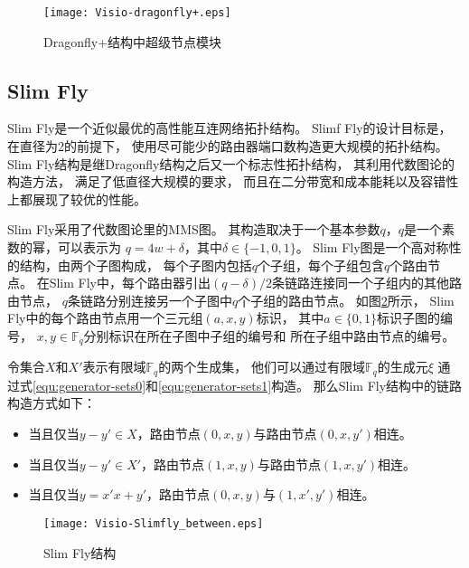 \begin{figure}[htp]
  \centering
    \texttt{[image: Visio-dragonfly+.eps]}
    \caption{Dragonfly+结构中超级节点模块}
    \label{dragonfly+}
\end{figure}

\subsection{Slim Fly}
Slim Fly是一个近似最优的高性能互连网络拓扑结构。
Slimf Fly的设计目标是，在直径为2的前提下，
使用尽可能少的路由器端口数构造更大规模的拓扑结构。
Slim Fly结构是继Dragonfly结构之后又一个标志性拓扑结构，
其利用代数图论的构造方法，
满足了低直径大规模的要求，
而且在二分带宽和成本能耗以及容错性上都展现了较优的性能。

Slim Fly采用了代数图论里的MMS图。
其构造取决于一个基本参数$q$，$q$是一个素数的幂，可以表示为
$q=4w+\delta$，其中$\delta \in \{-1,0,1\}$。
Slim Fly图是一个高对称性的结构，由两个子图构成，
每个子图内包括$q$个子组，每个子组包含$q$个路由节点。
在Slim Fly中，每个路由器引出$(q-\delta)/2$条链路连接同一个子组内的其他路由节点，
$q$条链路分别连接另一个子图中$q$个子组的路由节点。
如图\ref{slimflyone}所示，
Slim Fly中的每个路由节点用一个三元组$(a,x,y)$标识，
其中$a\in \{0,1\}$标识子图的编号，
$x,y\in\mathds{F}_q$分别标识在所在子图中子组的编号和
所在子组中路由节点的编号。

令集合$X$和$X'$表示有限域$\mathds{F}_q$的两个生成集，
他们可以通过有限域$\mathds{F}_q$的生成元$\xi$
通过式\ref{equ:generator-sets0}和\ref{equ:generator-sets1}构造。
那么Slim Fly结构中的链路构造方式如下：
\begin{itemize}
\item 当且仅当$y-y' \in X$，路由节点$(0,x,y)$与路由节点$(0,x,y')$相连。
\item 当且仅当$y-y' \in X'$，路由节点$(1,x,y)$与路由节点$(1,x,y')$相连。
\item 当且仅当$y=x'x+y'$，路由节点$(0,x,y)$与$(1,x',y')$相连。
\end{itemize}

\begin{figure}
  \centering
    \texttt{[image: Visio-Slimfly\_between.eps]}
    \caption{Slim Fly结构}
    \label{slimflyone}
\end{figure}


